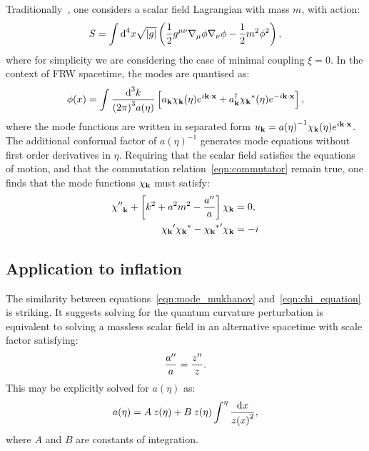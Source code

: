 Traditionally~\cite{Birrell+1984,Parker+2009}, one considers a scalar field Lagrangian with mass $m$, with action:
\begin{equation}
  S = \int \d[4]{x} \sqrt{|g|}\left( \frac{1}{2}g^{\mu\nu}\nabla_\mu\phi\nabla_\nu\phi - \frac{1}{2}m^2\phi^2 \right),
  \label{eqn:scalar_field}
\end{equation}
where for simplicity we are considering the case of minimal coupling $\xi=0$.  
In the context of FRW spacetime, the modes are quantised as:
\begin{equation}
  \phi(x) = \int\frac{\d[3]{k}}{{(2\pi)}^3a(\eta)} \left[ a_\vk \chi_\vk(\eta)e^{i\vk\cdot\vx} + a_{\vk}^{\dagger} \str{\chi_\vk}(\eta)e^{-i\vk\cdot\vx} \right],
  \label{eqn:mode_expansion}
\end{equation}
where the mode functions are written in separated form $u_{\mathbf{k}} = a{(\eta)}^{-1}\chi_{\mathbf{k}}(\eta)e^{i \mathbf{k}\cdot\mathbf{x}}$. The additional conformal factor of ${a(\eta)}^{-1}$ generates mode equations without first order derivatives in $\eta$.
Requiring that the scalar field satisfies the equations of motion, and that the commutation relation~\eqref{eqn:commutator} remain true,
one finds that the mode functions $\chi_{\mathbf{k}}$ must satisfy:
\begin{align}
  \dprm{\chi}_\vk + \left[ k^2 + a^2 m^2 - \frac{\dprm{a}}{a}  \right] \chi_\vk &= 0,
  \label{eqn:chi_equation}\\
  \prm{\chi_\vk} \str{\chi_\vk} - \prm{\str{\chi_\vk}} \chi_\vk &= -i
  \label{eqn:normalisation_1}
\end{align}

\subsection{Application to inflation}
\label{sec:bridge}
The similarity between equations~\eqref{eqn:mode_mukhanov} and~\eqref{eqn:chi_equation} is striking. It suggests solving for the quantum curvature perturbation is equivalent to solving a massless scalar field in an alternative spacetime with scale factor satisfying:
\begin{equation}
  \frac{\dprm{a}}{a} = \frac{\dprm{z}}{z}.
  \label{eqn:mapping}
\end{equation}
This may be explicitly solved for $a(\eta)$ as:
\begin{equation}
  a(\eta) = A\:z(\eta) + B\:z(\eta) \int^\eta \frac{\d{x}}{{z(x)}^2},
  \label{eqn:a_sol}
\end{equation}
where $A$ and $B$ are constants of integration. 

